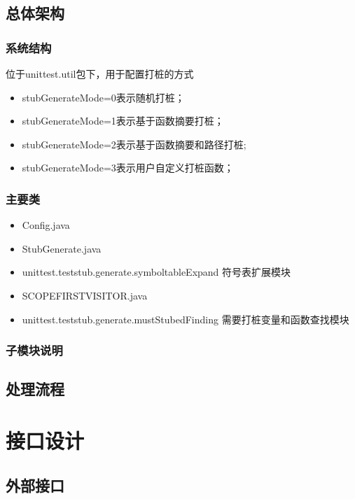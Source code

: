 \documentclass{article}
\begin{document}
		\subsection{总体架构}
			\subsubsection{系统结构}
			位于unittest.util包下，用于配置打桩的方式 \\
			\begin{itemize}
			 \item stubGenerateMode=0表示随机打桩；
			 \item stubGenerateMode=1表示基于函数摘要打桩；
			\item stubGenerateMode=2表示基于函数摘要和路径打桩;
			\item stubGenerateMode=3表示用户自定义打桩函数；
			\end{itemize}
			
				
			\subsubsection{主要类}
				
			
				\begin{itemize}
				 	\item Config.java
					\item StubGenerate.java
					\item     
					unittest.teststub.generate.symboltableExpand 符号表扩展模块
					
					\item SCOPEFIRSTVISITOR.java
					
					\item unittest.teststub.generate.mustStubedFinding 需要打桩变量和函数查找模块
				
				\end{itemize}
	
			\subsubsection{子模块说明}		
		\subsection{处理流程}
			
	\section{接口设计}
		\subsection{外部接口}
			
\end{document}
